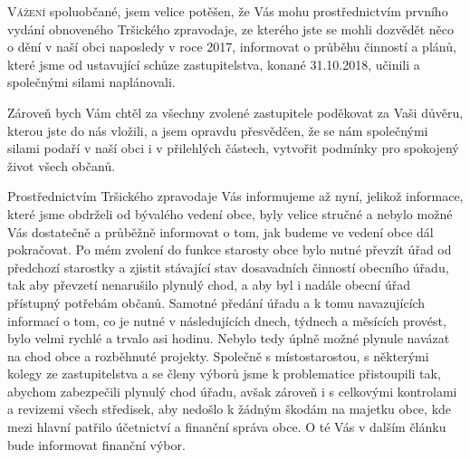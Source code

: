 \documentclass[10pt]{article}
\begin{document}
\begin{multicols}{3}{

\lettrine{V}{ážení} spoluobčané, jsem velice potěšen, že Vás mohu prostřednictvím prvního vydání obnoveného Tršického zpravodaje, ze kterého jste se mohli dozvědět něco o dění v naší obci naposledy v roce 2017, informovat o průběhu činností a plánů, které jsme od ustavující schůze zastupitelstva, konané 31.10.2018, učinili a společnými silami naplánovali.

Zároveň bych Vám chtěl za všechny zvolené zastupitele poděkovat za Vaši důvěru, kterou jste do nás vložili, a jsem opravdu přesvědčen, že se nám společnými silami podaří v naší obci i v přilehlých částech, vytvořit podmínky pro spokojený život všech občanů.

Prostřednictvím Tršického zpravodaje Vás informujeme až nyní, jelikož informace, které jsme obdrželi od bývalého vedení obce, byly velice stručné a nebylo možné Vás dostatečně a průběžně informovat o tom, jak budeme ve vedení obce dál pokračovat. Po mém zvolení do funkce starosty obce bylo nutné převzít úřad od předchozí starostky a zjistit stávající stav dosavadních činností obecního úřadu, tak aby převzetí nenarušilo plynulý chod, a aby byl i nadále obecní úřad přístupný potřebám občanů. Samotné předání úřadu a k tomu navazujících informací o tom, co je nutné v následujících dnech, týdnech a měsících provést, bylo velmi rychlé a trvalo asi hodinu. Nebylo tedy úplně možné plynule navázat na chod obce a rozběhnuté projekty. Společně s místostarostou, s některými kolegy ze zastupitelstva a se členy výborů jsme k problematice přistoupili tak, abychom zabezpečili plynulý chod úřadu, avšak zároveň i s celkovými kontrolami a revizemi všech středisek, aby nedošlo k žádným škodám na majetku obce, kde mezi hlavní patřilo účetnictví a finanční správa obce. O té Vás v dalším článku bude informovat finanční výbor.

}
\end{multicols}
\end{document}

